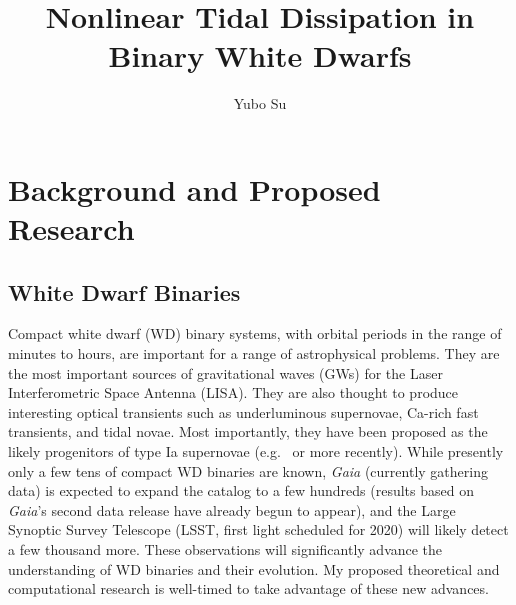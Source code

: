 \documentclass[12pt,
        usenames, %
        dvipsnames %
    ]{article}
\begin{document}
\renewcommand*{\sectionautorefname}{Section}

\singlespacing

\pagestyle{fancy}
\rhead{}
\cfoot{\thepage/\pageref{LastPage}}

\title{Nonlinear Tidal Dissipation in Binary White Dwarfs}
\author{Yubo Su}
\date{}

\maketitle

\section{Background and Proposed Research}\label{s:1}

\subsection{White Dwarf Binaries}

Compact white dwarf (WD) binary systems, with orbital periods in the range of
minutes to hours, are important for a range of astrophysical problems. They are
the most important sources of gravitational waves (GWs) for the Laser
Interferometric Space Antenna (LISA)\cite{lisa}. They are also thought to
produce interesting optical transients such as underluminous
supernovae\cite{underlum}, Ca-rich fast transients\cite{carich}, and tidal
novae\cite{tidal_novae}. Most importantly, they have been proposed as the likely
progenitors of type Ia supernovae (e.g.~\cite{Ia0,webbink} or more
recently\cite{Ia1,Ia2}). While presently only a few tens of compact WD binaries
are known\cite{lsst_wd}, \emph{Gaia} (currently gathering data) is expected to
expand the catalog to a few hundreds\cite{lsst_wd} (results based on
\emph{Gaia}'s second data release have already begun to
appear\cite{gaiaDD,gaiaDD2}), and the Large Synoptic Survey Telescope (LSST,
first light scheduled for 2020) will likely detect a few thousand
more\cite{lsst_wd}. These observations will significantly advance the
understanding of WD binaries and their evolution. My proposed theoretical and
computational research is well-timed to take advantage of these new advances.
\end{document}
